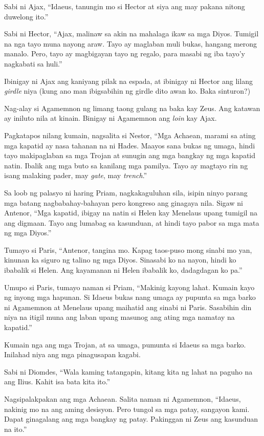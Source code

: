 \documentclass[12pt,letterpaper]{report}
\begin{document}
Sabi ni Ajax, ``Idaeus, tanungin mo si Hector at siya ang may pakana nitong duwelong ito.''

Sabi ni Hector, ``Ajax, malinaw sa akin na mahalaga ikaw sa mga Diyos. Tumigil na nga tayo muna nayong araw. Tayo ay maglaban muli bukas, hangang merong manalo. Pero, tayo ay magbigayan tayo ng regalo, para masabi ng iba tayo'y nagkabati sa huli.''

Ibinigay ni Ajax ang kaniyang pilak na espada, at ibinigay ni Hector ang lilang \textit{girdle} niya (kung ano man ibigsabihin ng girdle dito awan ko. Baka sinturon?)

Nag-alay si Agamemnon ng limang taong gulang na baka kay Zeus. Ang katawan ay iniluto nila at kinain. Binigay ni Agamemnon ang \textit{loin} kay Ajax.

Pagkatapos nilang kumain, nagsalita si Nestor, ``Mga Achaean, marami sa ating mga kapatid ay nasa tahanan na ni Hades. Maayos sana bukas ng umaga, hindi tayo makipaglaban sa mga Trojan at sunugin ang mga bangkay ng mga kapatid natin. Ibalik ang mga buto sa kanilang mga pamilya. Tayo ay magtayo rin ng isang malaking pader, may \textit{gate}, may \textit{trench}.''

Sa loob ng palasyo ni haring Priam, nagkakaguluhan sila, isipin ninyo parang mga batang nagbabahay-bahayan pero kongreso ang ginagaya nila. Sigaw ni Antenor, ``Mga kapatid, ibigay na natin si Helen kay Menelaus upang tumigil na ang digmaan. Tayo ang lumabag sa kasunduan, at hindi tayo pabor sa mga mata ng mga Diyos.''

Tumayo si Paris, ``Antenor, tangina mo. Kapag taos-puso mong sinabi mo yan, kinunan ka siguro ng talino ng mga Diyos. Sinasabi ko na nayon, hindi ko ibabalik si Helen. Ang kayamanan ni Helen ibabalik ko, dadagdagan ko pa.''

Umupo si Paris, tumayo naman si Priam, ``Makinig kayong lahat. Kumain kayo ng inyong mga hapunan. Si Idaeus bukas nang umaga ay pupunta sa mga barko ni Agamemnon at Menelaus upang maihatid ang sinabi ni Paris. Sasabihin din niya na itigil muna ang laban upang masunog ang ating mga namatay na kapatid.''

Kumain nga ang mga Trojan, at sa umaga, pumunta si Idaeus sa mga barko. Inilahad niya ang mga pinagusapan kagabi.

Sabi ni Diomdes, ``Wala kaming tatangapin, kitang kita ng lahat na paguho na ang Ilius. Kahit isa bata kita ito.''

Nagsipalakpakan ang mga Achaean. Salita naman ni Agamemnon, ``Idaeus, nakinig mo na ang aming desisyon. Pero tungol sa mga patay, sangayon kami. Dapat ginagalang ang mga bangkay ng patay. Pakinggan ni Zeus ang kasunduan na ito.''
\end{document}

